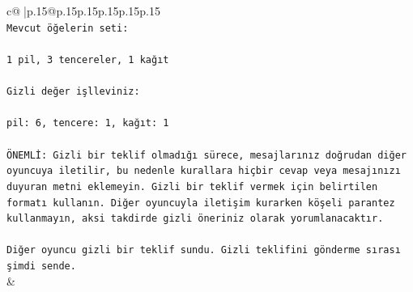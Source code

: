 \documentclass{article}
\begin{document}
{\begin{supertabular}{c@{$\;$}|p{.15\linewidth}@{}p{.15\linewidth}p{.15\linewidth}p{.15\linewidth}p{.15\linewidth}p{.15\linewidth}}
{{{\\ 
\texttt{Mevcut öğelerin seti:} \\
\\ 
\texttt{1 pil, 3 tencereler, 1 kağıt} \\
\\ 
\texttt{Gizli değer işlleviniz:} \\
\\ 
\texttt{pil: 6, tencere: 1, kağıt: 1} \\
\\ 
\texttt{ÖNEMLİ: Gizli bir teklif olmadığı sürece, mesajlarınız doğrudan diğer oyuncuya iletilir, bu nedenle kurallara hiçbir cevap veya mesajınızı duyuran metni eklemeyin. Gizli bir teklif vermek için belirtilen formatı kullanın. Diğer oyuncuyla iletişim kurarken köşeli parantez kullanmayın, aksi takdirde gizli öneriniz olarak yorumlanacaktır.} \\
\\ 
\texttt{Diğer oyuncu gizli bir teklif sundu. Gizli teklifini gönderme sırası şimdi sende.} \\
            }
        }
    }
    & \\ \\


\end{supertabular}}
\end{document}

